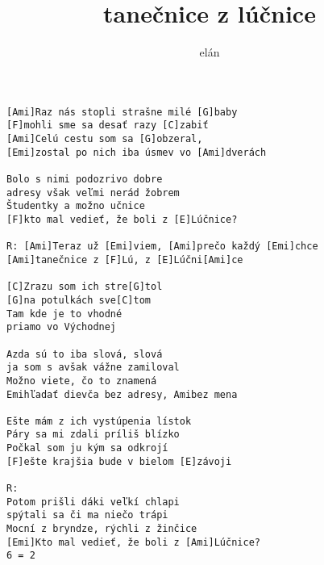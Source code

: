 \author{elán}
\title{tanečnice z lúčnice}
\maketitle
\begin{verbatim}
[Ami]Raz nás stopli strašne milé [G]baby 
[F]mohli sme sa desať razy [C]zabiť 
[Ami]Celú cestu som sa [G]obzeral, 
[Emi]zostal po nich iba úsmev vo [Ami]dverách 

Bolo s nimi podozrivo dobre 
adresy však veľmi nerád žobrem 
Študentky a možno učnice 
[F]kto mal vedieť, že boli z [E]Lúčnice? 

R: [Ami]Teraz už [Emi]viem, [Ami]prečo každý [Emi]chce 
[Ami]tanečnice z [F]Lú, z [E]Lúčni[Ami]ce 

[C]Zrazu som ich stre[G]tol 
[G]na potulkách sve[C]tom 
Tam kde je to vhodné 
priamo vo Východnej 

Azda sú to iba slová, slová 
ja som s avšak vážne zamiloval 
Možno viete, čo to znamená 
Emihľadať dievča bez adresy, Amibez mena 

Ešte mám z ich vystúpenia lístok 
Páry sa mi zdali príliš blízko 
Počkal som ju kým sa odkrojí 
[F]ešte krajšia bude v bielom [E]závoji 

R: 
Potom prišli dáki veľkí chlapi 
spýtali sa či ma niečo trápi 
Mocní z bryndze, rýchli z žinčice 
[Emi]Kto mal vedieť, že boli z [Ami]Lúčnice? 
6 = 2 
\end{verbatim}
